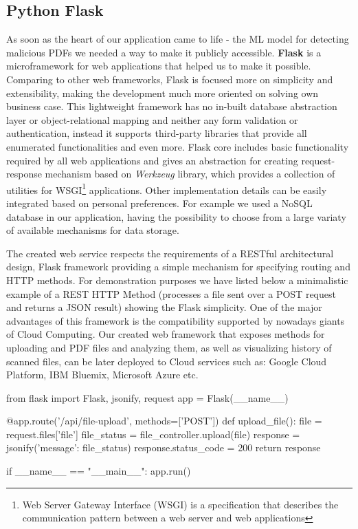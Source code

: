 \subsection{Python Flask}
As soon as the heart of our application came to life - the ML model for detecting malicious PDFs we needed a way to make it publicly accessible. \textbf{Flask} is a microframework for web applications that helped us to make it possible. Comparing to other web frameworks, Flask is focused more on simplicity and extensibility, making the development much more oriented on solving own business case. This lightweight framework has no in-built database abstraction layer or object-relational mapping and neither any form validation or authentication, instead it supports third-party libraries that provide all enumerated functionalities and even more. Flask core includes basic functionality required by all web applications and gives an abstraction for creating request-response mechanism based on \textit{Werkzeug} library, which provides a collection of utilities for WSGI\footnote{Web Server Gateway Interface (WSGI) is a specification that describes the communication pattern between a web server and web applications} applications. Other implementation details can be easily integrated based on personal preferences. For example we used a NoSQL database in our application, having the possibility to choose from a large variaty of available mechanisms for data storage. \par
The created web service respects the requirements of a RESTful architectural design, Flask framework providing a simple mechanism for specifying routing and HTTP methods. For demonstration purposes we have listed below a minimalistic example of a REST HTTP Method (processes a file sent over a POST request and returns a JSON result) showing the Flask simplicity. One of the major advantages of this framework is the compatibility supported by nowadays giants of Cloud Computing. Our created web framework that exposes methods for uploading and PDF files and analyzing them, as well as visualizing history of scanned files, can be later deployed to Cloud services such as: Google Cloud Platform, IBM Bluemix, Microsoft Azure etc. 

\newpage

\begin{python}
from flask import Flask, jsonify, request
app = Flask(__name__)

@app.route('/api/file-upload', methods=['POST'])
def upload_file():
	file = request.files['file']
	file_status = file_controller.upload(file)
	response = jsonify({'message': file_status})
	response.status_code = 200
	return response

if __name__ == "__main__":
    app.run()
\end{python}


